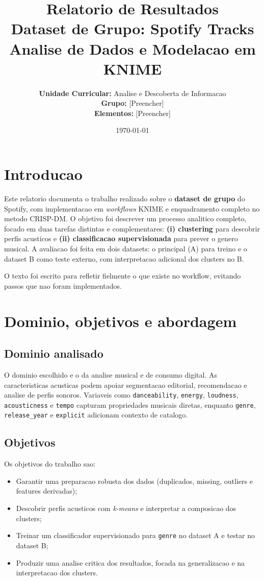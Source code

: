 \documentclass[11pt,a4paper]{article}
\title{\textbf{Relatorio de Resultados}\\
Dataset de Grupo: Spotify Tracks\\
\large Analise de Dados e Modelacao em KNIME}
\author{\textbf{Unidade Curricular:} Analise e Descoberta de Informacao \\
\textbf{Grupo:} [Preencher] \\
\textbf{Elementos:} [Preencher]}
\date{\today}
\begin{document}
\maketitle
\thispagestyle{empty}
\clearpage
\tableofcontents
\clearpage
{}

\section{Introducao}
Este relatorio documenta o trabalho realizado sobre o \textbf{dataset de grupo} do Spotify, com implementacao em \textit{workflows} KNIME e enquadramento completo no metodo CRISP-DM. O objetivo foi descrever um processo analitico completo, focado em duas tarefas distintas e complementares: \textbf{(i) clustering} para descobrir perfis acusticos e \textbf{(ii) classificacao supervisionada} para prever o genero musical. A avaliacao foi feita em dois datasets: o principal (A) para treino e o dataset B como teste externo, com interpretacao adicional dos clusters no B.

O texto foi escrito para refletir fielmente o que existe no workflow, evitando passos que nao foram implementados.

\section{Dominio, objetivos e abordagem}
\subsection{Dominio analisado}
O dominio escolhido e o da analise musical e de consumo digital. As caracteristicas acusticas podem apoiar segmentacao editorial, recomendacao e analise de perfis sonoros. Variaveis como \texttt{danceability}, \texttt{energy}, \texttt{loudness}, \texttt{acousticness} e \texttt{tempo} capturam propriedades musicais diretas, enquanto \texttt{genre}, \texttt{release\_year} e \texttt{explicit} adicionam contexto de catalogo.

\subsection{Objetivos}
Os objetivos do trabalho sao:
\begin{itemize}[leftmargin=*]
    \item Garantir uma preparacao robusta dos dados (duplicados, missing, outliers e features derivadas);
    \item Descobrir perfis acusticos com \textit{k-means} e interpretar a composicao dos clusters;
    \item Treinar um classificador supervisionado para \texttt{genre} no dataset A e testar no dataset B;
    \item Produzir uma analise critica dos resultados, focada na generalizacao e na interpretacao dos clusters.
\end{itemize}
\end{document}
